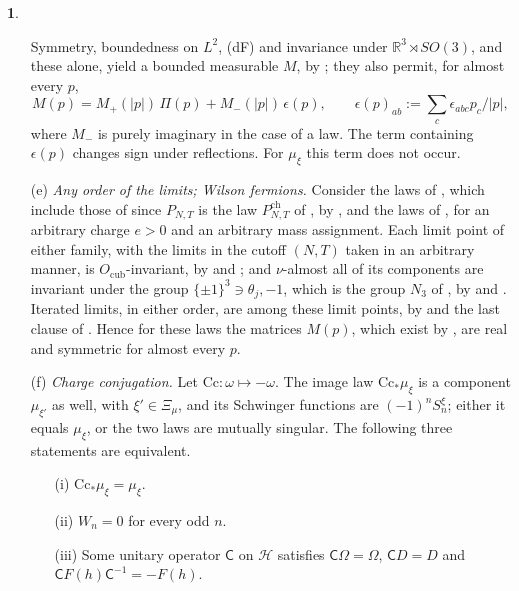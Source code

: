 \documentclass[11pt]{amsart}
\newcommand{\namedhead}{}
\theoremstyle{definition}
\newtheorem*{namedinner}{\namedhead}
\newenvironment{named}[1]{\renewcommand{\namedhead}{#1}\begin{namedinner}}{\end{namedinner}}
\begin{document}
\begin{named}{Proposition 3.5}
\begin{itemize}
Symmetry, boundedness on $L^2$, (dF) and invariance under $\mathbb R^3\rtimes SO(3)$, and these alone, yield a bounded measurable $M$, by \cite[proof of Theorem~14.26, Step~7]{QEDII}; they also permit, for almost every $p$,
\begin{equation*}
M(p)=M_+(|p|)\,\Pi(p)+M_-(|p|)\,\epsilon(p),\qquad \epsilon(p)_{ab}:=\sum_c\epsilon_{abc}p_c/|p|,
\end{equation*}
where $M_-$ is purely imaginary in the case of a law.
The term containing $\epsilon(p)$ changes sign under reflections.
For $\mu_\xi$ this term does not occur.
\item[(e)] \emph{Any order of the limits; Wilson fermions.}
Consider the laws of \cite[Theorem~1.3\,(a)]{QEDII}, which include those of \cite[Theorem~44\,(B)]{QEDIII} since $P_{N,T}$ is the law $P^{\mathrm{ch}}_{N,T}$ of \cite[Definition~2.36]{QEDII}, by \cite[Section~I.7.5]{QEDIII}, and the laws of \cite[Theorem~3.1, Part~I\,(b), (c)]{QEDI}, for an arbitrary charge $e>0$ and an arbitrary mass assignment.
Each limit point of either family, with the limits in the cutoff $(N,T)$ taken in an arbitrary manner, is $O_{\mathrm{cub}}$-invariant, by \cite[Theorem~3.1, Part~I\,(b), (P5)]{QEDI} and \cite[Theorem~1.3\,(a)]{QEDII}; and $\nu$-almost all of its components are invariant under the group $\{\pm1\}^3\ni\theta_j,-1$, which is the group $N_3$ of \cite[Section~2.5]{QEDI}, by \cite[Theorem~3.1, Part~I\,(c)]{QEDI} and \cite[Theorem~1.3\,(a)]{QEDII}.
Iterated limits, in either order, are among these limit points, by \cite[Theorem~3.1, Part~I\,(d)]{QEDI} and the last clause of \cite[Theorem~1.3\,(a)]{QEDII}.
Hence for these laws the matrices $M(p)$, which exist by \cite[proof of Theorem~14.26, Step~7]{QEDII}, are real and symmetric for almost every $p$.
\item[(f)] \emph{Charge conjugation.}
Let $\mathrm{Cc}\colon\omega\mapsto-\omega$.
The image law $\mathrm{Cc}_*\mu_\xi$ is a component $\mu_{\xi'}$ as well, with $\xi'\in\Xi_\mu$, and its Schwinger functions are $(-1)^nS_n^\xi$; either it equals $\mu_\xi$, or the two laws are mutually singular.
The following three statements are equivalent.
\begin{itemize}
\item[(i)] $\mathrm{Cc}_*\mu_\xi=\mu_\xi$.
\item[(ii)] $W_n=0$ for every odd $n$.
\item[(iii)] Some unitary operator $\mathsf C$ on $\mathcal H$ satisfies $\mathsf C\Omega=\Omega$, $\mathsf CD=D$ and $\mathsf CF(h)\mathsf C^{-1}=-F(h)$.
\end{itemize}

\end{itemize}
\end{named}
\end{document}
